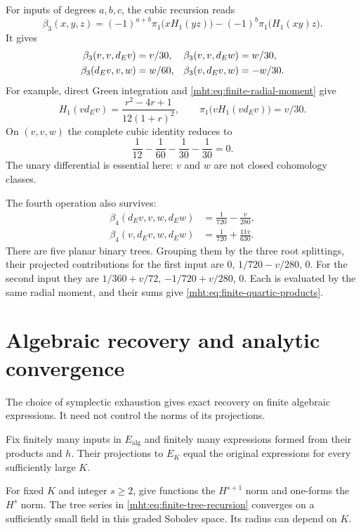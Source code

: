 For inputs of degrees $a,b,c$, the cubic recursion reads
\[
 \beta_3(x,y,z)=(-1)^{a+b}\pi_1\bigl(xH_1(yz)\bigr)
                      -(-1)^b\pi_1\bigl(H_1(xy)z\bigr).
\]
It gives
\begin{align}
 \beta_3(v,v,d_Ev)&=v/30,&
 \beta_3(v,v,d_Ew)&=w/30,\notag\\
 \beta_3(d_Ev,v,w)&=w/60,&
 \beta_3(v,d_Ev,w)&=-w/30.
 \label{mht:eq:finite-cubic-products}
\end{align}
For example, direct Green integration and
\eqref{mht:eq:finite-radial-moment} give
\[
 H_1(vd_Ev)=\frac{r^2-4r+1}{12(1+r)^2},\qquad
 \pi_1\bigl(vH_1(vd_Ev)\bigr)=v/30.
\]
On $(v,v,w)$ the complete cubic identity reduces to
\[
 \frac1{12}-\frac1{60}-\frac1{30}-\frac1{30}=0.
\]
The unary differential is essential here: $v$ and $w$ are not
closed cohomology classes.

The fourth operation also survives:
\begin{equation}\label{mht:eq:finite-quartic-products}
 \begin{aligned}
 \beta_4(d_Ev,v,w,d_Ew)&=\frac1{720}-\frac v{280},\\
 \beta_4(v,d_Ev,w,d_Ew)&=\frac1{720}+\frac{11v}{630}.
 \end{aligned}
\end{equation}
There are five planar binary trees. Grouping them by the three
root splittings, their projected contributions for the first input
are $0$, $1/720-v/280$, $0$. For the second input they are
$1/360+v/72$, $-1/720+v/280$, $0$.
Each is evaluated by the same radial moment, and their sums give
\eqref{mht:eq:finite-quartic-products}.

\section{Algebraic recovery and analytic convergence}

The choice of symplectic exhaustion gives exact recovery on finite
algebraic expressions. It need not control the norms of its projections.

\begin{proposition}\label{mht:prop:finite-recovery}
Fix finitely many inputs in $E_{\mathrm{alg}}$ and finitely many
expressions formed from their products and $h$. Their projections
to $E_K$ equal the original expressions for every sufficiently
large $K$.

For fixed $K$ and integer $s\geq2$, give functions the $H^{s+1}$
norm and one-forms the $H^s$ norm. The tree series in
\eqref{mht:eq:finite-tree-recursion} converges on a sufficiently
small field in this graded Sobolev space. Its radius can depend on $K$.
\end{proposition}

